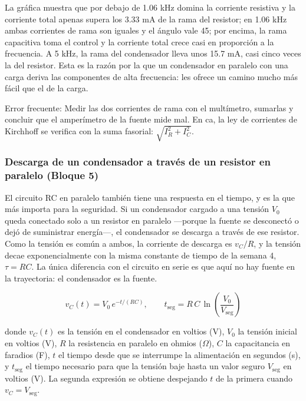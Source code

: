 \documentclass[11pt,letterpaper]{article}
\begin{document}
La gráfica muestra que por debajo de 1.06 kHz domina la corriente resistiva y la corriente total apenas supera los 3.33 mA de la rama del resistor; en 1.06 kHz ambas corrientes de rama son iguales y el ángulo vale 45\textdegree{}; por encima, la rama capacitiva toma el control y la corriente total crece casi en proporción a la frecuencia. A 5 kHz, la rama del condensador lleva unos 15.7 mA, casi cinco veces la del resistor. Esta es la razón por la que un condensador en paralelo con una carga \guillemotleft{}deriva\guillemotright{} las componentes de alta frecuencia: les ofrece un camino mucho más fácil que el de la carga.

\begin{nota}{Error frecuente:}
Medir las dos corrientes de rama con el multímetro, sumarlas y concluir que el amperímetro de la fuente \guillemotleft{}mide mal\guillemotright{}. En ca, la ley de corrientes de Kirchhoff se verifica con la suma fasorial: $\sqrt{I_R^2 + I_C^2}$.
\end{nota}

\subsubsection{Descarga de un condensador a través de un resistor en paralelo (Bloque 5)}

El circuito RC en paralelo también tiene una respuesta en el tiempo, y es la que más importa para la seguridad. Si un condensador cargado a una tensión $V_0$ queda conectado solo a un resistor en paralelo ---porque la fuente se desconectó o dejó de suministrar energía---, el condensador se descarga a través de ese resistor. Como la tensión es común a ambos, la corriente de descarga es $v_C/R$, y la tensión decae exponencialmente con la misma constante de tiempo de la semana 4, $\tau = RC$. La única diferencia con el circuito en serie es que aquí no hay fuente en la trayectoria: el condensador es la fuente.

\begin{equation}
  v_C(t) = V_0\,e^{-t/(RC)}, \qquad t_{\mathrm{seg}} = R\,C\,\ln\!\left(\frac{V_0}{V_{\mathrm{seg}}}\right)
\end{equation}

donde $v_C(t)$ es la tensión en el condensador en voltios (V), $V_0$ la tensión inicial en voltios (V), $R$ la resistencia en paralelo en ohmios (\ensuremath{\Omega}), $C$ la capacitancia en faradios (F), $t$ el tiempo desde que se interrumpe la alimentación en segundos (s), y $t_{\mathrm{seg}}$ el tiempo necesario para que la tensión baje hasta un valor seguro $V_{\mathrm{seg}}$ en voltios (V). La segunda expresión se obtiene despejando $t$ de la primera cuando $v_C = V_{\mathrm{seg}}$.
\end{document}
